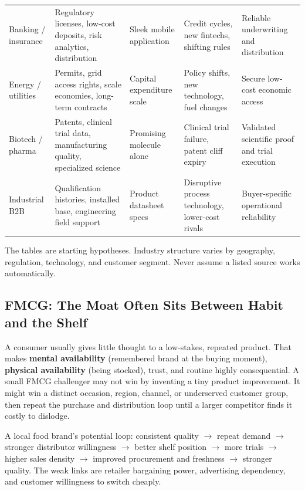 \begin{table}[t]
\begin{tabularx}{\textwidth}{p{2.3cm} p{3.2cm} p{2.4cm} p{2.6cm} X}
\addlinespace[3pt]
Banking / insurance & Regulatory licenses, low-cost deposits, risk analytics, distribution & Sleek mobile application & Credit cycles, new fintechs, shifting rules & Reliable underwriting and distribution \\
\addlinespace[3pt]
Energy / utilities & Permits, grid access rights, scale economies, long-term contracts & Capital expenditure scale & Policy shifts, new technology, fuel changes & Secure low-cost economic access \\
\addlinespace[3pt]
Biotech / pharma & Patents, clinical trial data, manufacturing quality, specialized science & Promising molecule alone & Clinical trial failure, patent cliff expiry & Validated scientific proof and trial execution \\
\addlinespace[3pt]
Industrial B2B & Qualification histories, installed base, engineering field support & Product datasheet specs & Disruptive process technology, lower-cost rivals & Buyer-specific operational reliability \\
\bottomrule
\end{tabularx}
\end{table}

The tables are starting hypotheses. Industry structure varies by geography, regulation, technology, and customer segment. Never assume a listed source works automatically.

\subsection{FMCG: The Moat Often Sits Between Habit and the Shelf}
\label{sec:fmcg_habit_and_shelf}

A consumer usually gives little thought to a low-stakes, repeated product. That makes \textbf{mental availability} (remembered brand at the buying moment), \textbf{physical availability} (being stocked), trust, and routine highly consequential. A small FMCG challenger may not win by inventing a tiny product improvement. It might win a distinct occasion, region, channel, or underserved customer group, then repeat the purchase and distribution loop until a larger competitor finds it costly to dislodge.

A local food brand's potential loop: consistent quality $\to$ repeat demand $\to$ stronger distributor willingness $\to$ better shelf position $\to$ more trials $\to$ higher sales density $\to$ improved procurement and freshness $\to$ stronger quality. The weak links are retailer bargaining power, advertising dependency, and customer willingness to switch cheaply.

